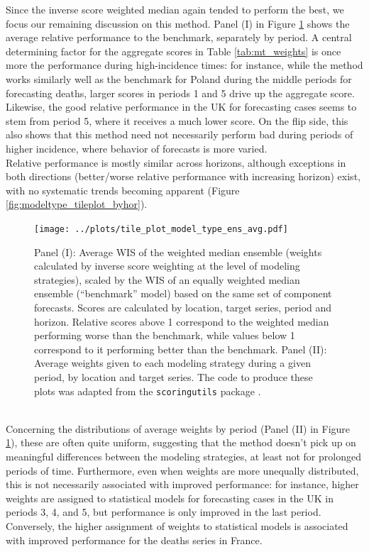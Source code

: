 Since the inverse score weighted median again tended to perform the best, we focus our remaining discussion on this method. Panel (I) in Figure \ref{fig:modeltype_tileplot} shows the average relative performance to the benchmark, separately by period. A central determining factor for the aggregate scores in Table \ref{tab:mt_weights} is once more the performance during high-incidence times: for instance, while the method works similarly well as the benchmark for Poland during the middle periods for forecasting deaths, larger scores in periods 1 and 5 drive up the aggregate score. Likewise, the good relative performance in the UK for forecasting cases seems to stem from period 5, where it receives a much lower score. On the flip side, this also shows that this method need not necessarily perform bad during periods of higher incidence, where behavior of forecasts is more varied.\\ 
Relative performance is mostly similar across horizons, although exceptions in both directions (better/worse relative performance with increasing horizon) exist, with no systematic trends becoming apparent (Figure \ref{fig:modeltype_tileplot_byhor}).
\begin{figure}
\centering
\texttt{[image: ../plots/tile\_plot\_model\_type\_ens\_avg.pdf]}
\caption{Panel (I): Average WIS of the weighted median ensemble (weights calculated by inverse score weighting at the level of modeling strategies), scaled by the WIS of an equally weighted median ensemble (``benchmark'' model) based on the same set of component forecasts. Scores are calculated by location, target series, period and horizon. Relative scores above 1 correspond to the weighted median performing worse than the benchmark, while values below 1 correspond to it performing better than the benchmark. Panel (II): Average weights given to each modeling strategy during a given period, by location and target series. The code to produce these plots was adapted from the \texttt{scoringutils} package \citep{bosse_evaluating_2022}.}
\label{fig:modeltype_tileplot}
\end{figure}\\
Concerning the distributions of average weights by period (Panel (II) in Figure \ref{fig:modeltype_tileplot}), these are often quite uniform, suggesting that the method doesn't pick up on meaningful differences between the modeling strategies, at least not for prolonged periods of time. Furthermore, even when weights are more unequally distributed, this is not necessarily associated with improved performance: for instance, higher weights are assigned to statistical models for forecasting cases in the UK in periods 3, 4, and 5, but performance is only improved in the last period. Conversely, the higher assignment of weights to statistical models is associated with improved performance for the deaths series in France. \\
